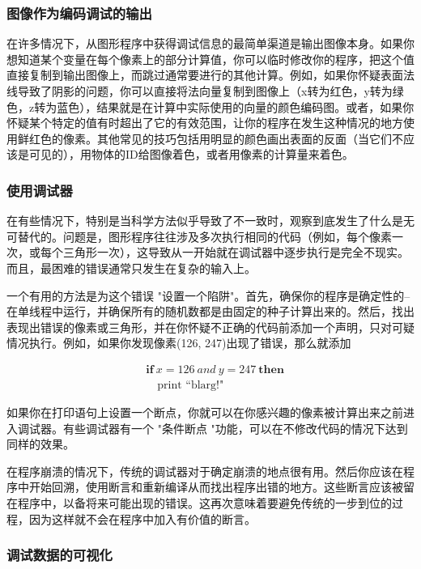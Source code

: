 \documentclass[lang=cn,10pt]{elegantbook}
\begin{document}
\subsubsection{图像作为编码调试的输出}

在许多情况下，从图形程序中获得调试信息的最简单渠道是输出图像本身。如果你想知道某个变量在每个像素上的部分计算值，你可以临时修改你的程序，把这个值直接复制到输出图像上，而跳过通常要进行的其他计算。例如，如果你怀疑表面法线导致了阴影的问题，你可以直接将法向量复制到图像上（x转为红色，y转为绿色，z转为蓝色），结果就是在计算中实际使用的向量的颜色编码图。或者，如果你怀疑某个特定的值有时超出了它的有效范围，让你的程序在发生这种情况的地方使用鲜红色的像素。其他常见的技巧包括用明显的颜色画出表面的反面（当它们不应该是可见的），用物体的ID给图像着色，或者用像素的计算量来着色。

\subsubsection{使用调试器}

在有些情况下，特别是当科学方法似乎导致了不一致时，观察到底发生了什么是无可替代的。问题是，图形程序往往涉及多次执行相同的代码（例如，每个像素一次，或每个三角形一次），这导致从一开始就在调试器中逐步执行是完全不现实。而且，最困难的错误通常只发生在复杂的输入上。

一个有用的方法是为这个错误 "设置一个陷阱"。首先，确保你的程序是确定性的--在单线程中运行，并确保所有的随机数都是由固定的种子计算出来的。然后，找出表现出错误的像素或三角形，并在你怀疑不正确的代码前添加一个声明，只对可疑情况执行。例如，如果你发现像素(126, 247)出现了错误，那么就添加


\[
  \begin{aligned}
  &\textbf{if}\ x=126 \ and\ y=247 \ \textbf{then} \\ 
  &\quad \text{print\ ``blarg!"}
  \end{aligned}
\]

如果你在打印语句上设置一个断点，你就可以在你感兴趣的像素被计算出来之前进入调试器。有些调试器有一个 "条件断点 "功能，可以在不修改代码的情况下达到同样的效果。

在程序崩溃的情况下，传统的调试器对于确定崩溃的地点很有用。然后你应该在程序中开始回溯，使用断言和重新编译从而找出程序出错的地方。这些断言应该被留在程序中，以备将来可能出现的错误。这再次意味着要避免传统的一步到位的过程，因为这样就不会在程序中加入有价值的断言。

\subsubsection{调试数据的可视化}
\end{document}
